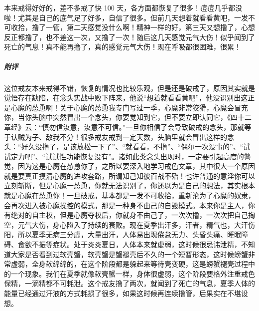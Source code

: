 \begin{case}
    本来戒得好好的，差不多戒了快 100 天，各方面都恢复了很多！痘痘几乎都没啦！尤其是自己的底气足了好多，自信了很多。但前几天想着就看看黄吧，一发不可收拾，撸了一管，第二天感觉没什么啊！精神一样的好，第三天又想撸了，心想反正都撸了，也不差这一次，又撸了一次！随后这几天感觉元气大伤！似乎闻到了死亡的气息！真不能再撸了，真的感觉元气大伤！现在呼吸都很困难，很累！
    \subparagraph{附评} 这位戒友本来戒得不错，恢复的情况也比较乐观，但是还是破戒了，原因其实就是觉悟存在缺陷，在念头实战中败下阵来，他说“想着就看看黄吧”，他没识别出这正是心魔的怂恿啊！关于心魔的怂恿我专门写过一季，心魔非常狡猾，心魔会冒充你，当你头脑中突然冒出一个念头，你要觉知到它，但不要立即认同它，《四十二章经》云：“慎勿信汝意，汝意不可信。”一旦你相信了会导致破戒的念头，那就等于认贼为子、敌我不分！很多戒友戒到一定天数，头脑里就会冒出这样的念头：“好久没撸了，是该放松一下了”、“就看看，不撸”、“偶尔一次没事的”、“试试定力吧”、“试试性功能恢复没有”。诸如此类念头出现时，一定要引起高度的警觉，因为这是心魔在怂恿你了，之所以要深入地学习戒色文章，其中很大一个原因就是要真正摸清心魔的进攻套路，所谓知己知彼百战不殆！也许普通的意淫你可以立刻斩断，但是心魔一怂恿，你就无法识别了，你还以为是自己的想法，其实根本就是心魔在怂恿你！一旦破戒，基本都是一发不可收拾，重新沦为了心魔的奴隶，会再次进入被心魔操控的模式，那是一种身不由己的自毁模式。本来你是主人，你有绝对的自主权，但是心魔夺权后，你就身不由己了，一次次撸，一次次把自己掏空，元气大伤，身心陷入了持续的衰败。现在夏季出汗多，汗者，精气也，大汗伤阳，所以夏季无病三分虚，大量出汗，人体易出现倦怠无力、头昏头痛、睡眠障碍、食欲不振等症状。处于炎炎夏日，人体本来就虚弱，这时候很忌讳泄精，不知道大家是否看到过软壳蟹，软壳蟹是蟹褪壳后不久的一个短暂形态，这时候螃蟹非常虚弱，全身软绵绵的，在这个阶段都是躲起来等待壳变硬，这是螃蟹褪壳过程中的一个现象。我们在夏季就像软壳蟹一样，身体很虚弱，这个阶段要格外注重戒色保精，一滴精都不可耗泄。这个戒友撸了两次，就闻到了死亡的气息，夏季人体的能量已经通过汗液的方式耗损了很多，如果这时候再连续撸管，后果实在不堪设想。
\end{case}

